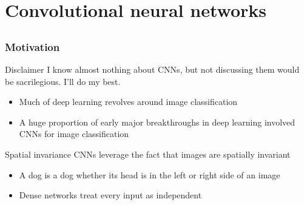 \section[CNNs]{Convolutional neural networks}

\subsection{}

\begin{frame}
    \frametitle{Motivation}

    \begin{block}{Disclaimer}
        I know almost nothing about CNNs, but not discussing them would be sacrilegious.
        I'll do my best.
    \end{block}

    \begin{itemize}
        \item Much of deep learning revolves around image classification
        \item A huge proportion of early major breakthroughs in deep learning involved CNNs for image classification
    \end{itemize}

    \begin{block}{Spatial invariance}
        CNNs leverage the fact that images are \alert{spatially invariant}
        \begin{itemize}
            \item A dog is a dog whether its head is in the left or right side of an image
            \item Dense networks treat every input as independent
        \end{itemize}
    \end{block}
\end{frame}

